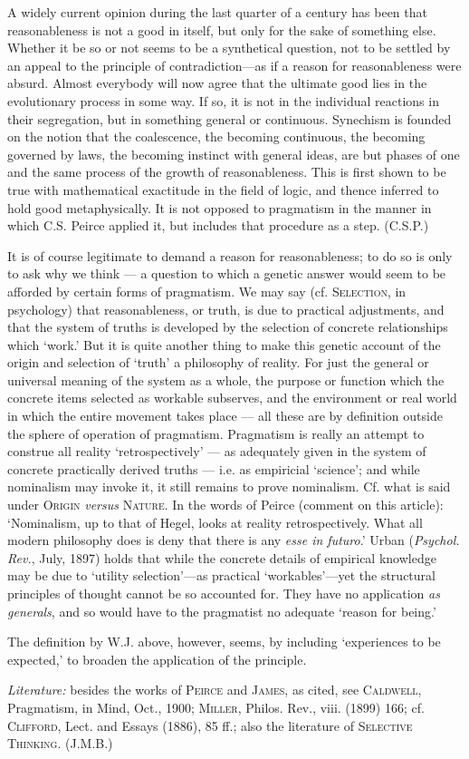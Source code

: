 \documentclass{article}
\begin{document}
A widely current opinion during the last quarter of a century has been that reasonableness is not a good in itself, but only for the sake of something else. Whether it be so or not seems to be a synthetical question, not to be settled by an appeal to the principle of contradiction---as if a reason for reasonableness were absurd. Almost everybody will now agree that the ultimate good lies in the evolutionary process in some way. If so, it is not in the individual reactions in their segregation, but in something general or continuous. Synechism is founded on the notion that the coalescence, the becoming continuous, the becoming governed by laws, the becoming instinct with general ideas, are but phases of one and the same process of the growth of reasonableness. This is first shown to be true with mathematical exactitude in the field of logic, and thence inferred to hold good metaphysically. It is not opposed to pragmatism in the manner in which C.S. Peirce applied it, but includes that procedure as a step. \hfill (C.S.P.)

It is of course legitimate to demand a reason for reasonableness; to do so is only to ask why we think --- a question to which a genetic answer would seem to be afforded by certain forms of pragmatism. We may say (cf. \textsc{Selection}, in psychology) that reasonableness, or truth, is due to practical adjustments, and that the system of truths is developed by the selection of concrete relationships which `work.' But it is quite another thing to make this genetic account of the origin and selection of `truth' a philosophy of reality. For just the general or universal meaning of the system as a whole, the purpose or function which the concrete items selected as workable subserves, and the environment or real world in which the entire movement takes place --- all these are by definition outside the sphere of operation of pragmatism. Pragmatism is really an attempt to construe all reality `retrospectively' --- as adequately given in the system of concrete practically derived truths --- i.e. as empiricial `science'; and while nominalism may invoke it, it still remains to prove nominalism. Cf. what is said under \textsc{Origin} \emph{versus} \textsc{Nature}. In the words of Peirce (comment on this article): `Nominalism, up to that of Hegel, looks at reality retrospectively. What all modern philosophy does is deny that there is any \emph{esse in futuro}.' Urban (\textit{Psychol. Rev.}, July, 1897) holds that while the concrete details of empirical knowledge may be due to `utility selection'---as practical `workables'---yet the structural principles of thought cannot be so accounted for. They have no application \textit{as generals}, and so would
have to the pragmatist no adequate `reason for being.'

The definition by W.J. above, however, seems, by including `experiences to be expected,' to broaden the application of the principle. 

\textit{Literature:} besides the works of \textsc{Peirce} and \textsc{James}, as cited, see \textsc{Caldwell}, Pragmatism, in Mind, Oct., 1900; \textsc{Miller}, Philos. Rev., viii. (1899) 166; cf. \textsc{Clifford}, Lect. and Essays (1886), 85 ff.; also the literature of \textsc{Selective Thinking}. \hfill(J.M.B.)
\end{document}
